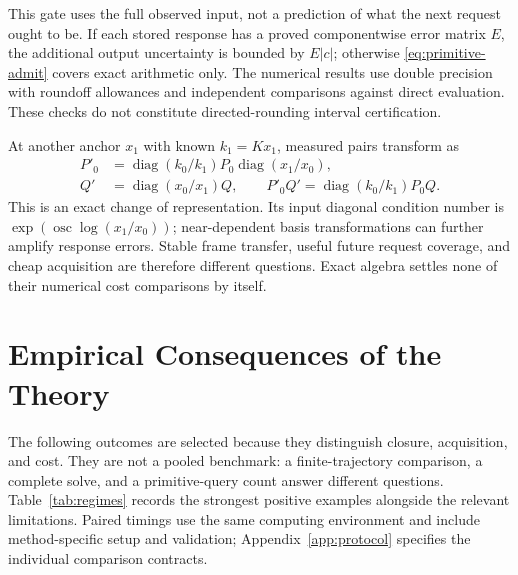 \documentclass[journal]{IEEEtran}
\theoremstyle{definition}
\DeclareMathOperator{\diag}{diag}
\DeclareMathOperator{\osc}{osc}
\begin{document}
This gate uses the full observed input, not a prediction of what the next
request ought to be. If each stored response has a proved componentwise
error matrix $E$, the additional output uncertainty is bounded by
$E|c|$; otherwise \eqref{eq:primitive-admit} covers exact arithmetic only.
The numerical results use double precision with roundoff allowances and
independent comparisons against direct evaluation. These checks do not
constitute directed-rounding interval certification.

At another anchor $x_1$ with known $k_1=Kx_1$, measured pairs transform as
\begin{align*}
 P'_0&=\diag(k_0/k_1)P_0\diag(x_1/x_0),\\
 Q'&=\diag(x_0/x_1)Q,\qquad P'_0Q'=\diag(k_0/k_1)P_0Q.
\end{align*}
This is an exact change of representation. Its input diagonal condition
number is $\exp(\osc\log(x_1/x_0))$; near-dependent basis transformations
can further amplify response errors. Stable frame transfer, useful future
request coverage, and cheap acquisition are therefore different questions.
Exact algebra settles none of their numerical cost comparisons by itself.

\section{Empirical Consequences of the Theory}
\label{sec:evidence}
The following outcomes are selected because they distinguish closure,
acquisition, and cost. They are not a pooled benchmark: a finite-trajectory
comparison, a complete solve, and a primitive-query count answer different
questions. Table~\ref{tab:regimes} records the strongest positive examples
alongside the relevant limitations. Paired timings use the same computing environment and include
method-specific setup and validation;
Appendix~\ref{app:protocol} specifies the individual comparison contracts.
\end{document}
